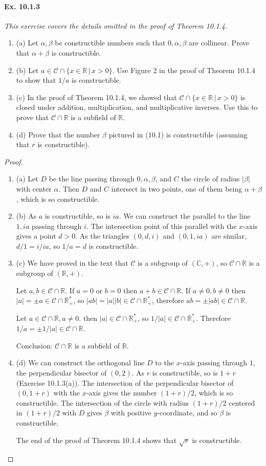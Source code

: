 \documentclass[11pt,a4paper]{article}
\newcommand{\be} {\begin{enumerate}}
\newcommand{\ee} {\end{enumerate}}
\newcommand{\R}{\mathbb{R}}
\newcommand{\C}{\mathbb{C}}
\begin{document}
\paragraph{Ex. 10.1.3}

{\it This exercise covers the details omitted in the proof of Theorem 10.1.4.
\be
\item[(a)] Let $\alpha,\beta$ be constructible numbers such that $0,\alpha,\beta$ are collinear. Prove that $\alpha+\beta$ is constructible.
\item[(b)] Let $a\in {\mathscr{C}} \cap \{x\in \R\, | \, x>0\}$. Use Figure 2 in the proof of Theorem 10.1.4 to show that $1/a$ is constructible.
\item[(c)] In the proof of Theorem 10.1.4, we showed that ${\mathscr{C}} \cap  \{x\in \R\, | \, x>0\}$ is closed under addition, multiplication, and multiplicative inverses. Use this to prove that ${\mathscr{C}} \cap \R$ is a subfield of $\R$.
\item[(d)] Prove that the number $\beta$ pictured in (10.1) is constructible (assuming that $r$ is constructible).
\ee
}

\begin{proof}
\be
\item[(a)] Let $D$ be the line passing through $0,\alpha,\beta$, and $C$ the circle of radius $|\beta|$ with center $\alpha$. Then $D$ and $C$ intersect in two points, one of them being $\alpha + \beta$, which is so constructible.
\item[(b)] As $a$ is constructible, so is $ia$. We can construct the parallel to the line $1,ia$ passing through $i$. The intersection point of this parallel with the $x$-axis gives a point $d>0$. As the triangles $(0,d,i)$ and $(0,1,ia)$ are similar, $d/1 = i/ia$, so $1/a = d$ is constructible.
\item[(c)] We have proved in the text that $\mathscr{C}$ is a subgroup of $(\C,+)$, so ${\mathscr{C}} \cap \R$ is a subgroup of $(\R,+)$.

Let $a,b\in {\mathscr{C}} \cap \R$. If $a = 0$ or $b = 0$ then $a+b \in  {\mathscr{C}} \cap \R$. If $a \ne 0, b\ne 0$ then $|a| = \pm a \in {\mathscr{C}} \cap \R_+^*$, so $|ab| = |a| |b| \in  {\mathscr{C}} \cap \R_+^*$, therefore $ab =\pm |ab| \in {\mathscr{C}} \cap \R$.

Let $a \in {\mathscr{C}} \cap \R, a\ne 0$. then $| a | \in {\mathscr{C}} \cap \R_+^*$, so $1/|a| \in {\mathscr{C}} \cap \R_+^*$. Therefore $1/a = \pm 1/|a| \in {\mathscr{C}} \cap \R$.

Conclusion: ${\mathscr{C}} \cap \R$ is a subfield of $\R$.
\item[(d)] We can construct the orthogonal line $D$ to the $x$-axis passing through $1$, the perpendicular bisector of $(0,2)$. As $r$ is constructible, so is $1+r$ (Exercise 10.1.3(a)). The intersection of the perpendicular bisector of $(0,1+r)$ with the $x$-axis gives the number $(1+r)/2$, which is so constructible. The intersection of the circle with radius $(1+r)/2$ centered in $(1+r)/2$ with $D$ gives $\beta$ with positive $y$-coordinate, and so $\beta$ is constructible.

The end of the proof of Theorem 10.1.4 shows that $\sqrt{r}$ is constructible.
\ee
\end{proof}
\end{document}

